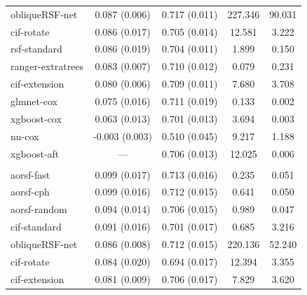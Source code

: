 \documentclass[12pt]{article}\usepackage[]{graphicx}\usepackage[]{xcolor}
\newenvironment{knitrout}{}{} %
\begin{document}
\begin{knitrout}
\begin{longtable}[t]{lcccc}
\hspace{1em}obliqueRSF-net & 0.087 (0.006) & 0.717 (0.011) & 227.346 & 90.031\\
\hspace{1em}cif-rotate & 0.086 (0.017) & 0.705 (0.014) & 12.581 & 3.222\\
\hspace{1em}rsf-standard & 0.086 (0.019) & 0.704 (0.011) & 1.899 & 0.150\\
\hspace{1em}ranger-extratrees & 0.083 (0.007) & 0.710 (0.012) & 0.079 & 0.231\\
\hspace{1em}cif-extension & 0.080 (0.006) & 0.709 (0.011) & 7.680 & 3.708\\
\hspace{1em}glmnet-cox & 0.075 (0.016) & 0.711 (0.019) & 0.133 & 0.002\\
\hspace{1em}xgboost-cox & 0.063 (0.013) & 0.701 (0.013) & 3.694 & 0.003\\
\hspace{1em}nn-cox & -0.003 (0.003) & 0.510 (0.045) & 9.217 & 1.188\\
\hspace{1em}xgboost-aft & --- & 0.706 (0.013) & 12.025 & 0.006\\
\addlinespace[0.3em]
\multicolumn{5}{l}{\textit{\textbf{Colon cancer; recurrence, n = 929, p = 12}}}\\
\hline
\hspace{1em}aorsf-fast & 0.099 (0.017) & 0.713 (0.016) & 0.235 & 0.051\\
\hspace{1em}aorsf-cph & 0.099 (0.016) & 0.712 (0.015) & 0.641 & 0.050\\
\hspace{1em}aorsf-random & 0.094 (0.014) & 0.706 (0.015) & 0.989 & 0.047\\
\hspace{1em}cif-standard & 0.091 (0.016) & 0.701 (0.017) & 0.685 & 3.216\\
\hspace{1em}obliqueRSF-net & 0.086 (0.008) & 0.712 (0.015) & 220.136 & 52.240\\
\hspace{1em}cif-rotate & 0.084 (0.020) & 0.694 (0.017) & 12.394 & 3.355\\
\hspace{1em}cif-extension & 0.081 (0.009) & 0.706 (0.017) & 7.829 & 3.620\\

\end{longtable}
\end{knitrout}
\end{document}
